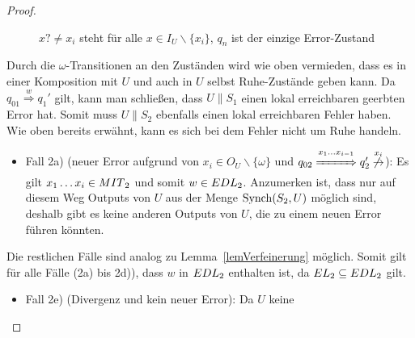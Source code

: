 \begin{proof}
\begin{itemize}
\begin{figure} [h!tbp]
\begin{center}
        \caption{$x?\neq x_i$ steht für alle $x\in I_U\backslash\{x_i\}$, $q_n$
          ist der einzige Error-Zustand}
\label{UmitEundO}
      \end{center}
      \end{figure}
      Durch die $\omega$-Transitionen an den Zuständen wird wie oben vermieden,
      dass es in einer Komposition mit $U$ und auch in $U$ selbst Ruhe-Zustände
      geben kann. Da $q_{01} \overset{w}{\Rightarrow} q_1'$ gilt, kann man schließen,
      dass $U\|S_1$ einen lokal erreichbaren geerbten Error hat. Somit muss
      $U\|S_2$ ebenfalls einen lokal erreichbaren Fehler haben. Wie oben
      bereits erwähnt, kann es sich bei dem Fehler nicht um Ruhe handeln.
      \begin{itemize}
        \item Fall 2a) \big(neuer Error aufgrund von $x_i\in O_U\backslash
          \{\omega\}$ und $q_{02} \overset{x_1\dots
          x_{i-1}}{\xRightarrow{\hspace{1cm}}} q_2'
          \overset{x_i}{\not{\hspace{-0.1cm}\rightarrow}}$\big): Es gilt $x_1\dots
          x_i\in MIT{}_2$ und somit $w\in EDL{}_2$. Anzumerken ist, dass nur
          auf diesem Weg Outputs von $U$ aus der Menge $\mathrm{Synch} (S_2,U)$ möglich sind, deshalb gibt
          es keine anderen Outputs von $U$, die zu einem neuen Error führen
          könnten.
      \end{itemize}
      Die restlichen Fälle sind analog zu Lemma~\ref{lemVerfeinerung} möglich.
      Somit gilt für alle Fälle (2a) bis 2d)), dass $w$ in $EDL{}_2$ enthalten
      ist, da $EL{}_2\subseteq EDL{}_2$ gilt.
      \begin{itemize}
        \item Fall 2e) (Divergenz und kein neuer Error): Da $U$ keine

\end{itemize}
\end{itemize}
\end{proof}
